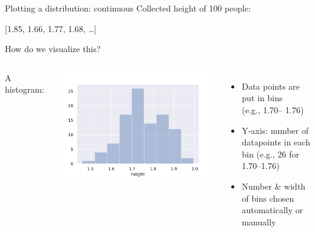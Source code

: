 \documentclass[aspectratio=169,usenames,dvipsnames]{beamer}
\begin{document}
\begin{frame}{Plotting a distribution: continuous}
Collected height of 100 people:

[1.85, 1.66, 1.77, 1.68, \dots]

\vspace{1em}
How do we visualize this?

\pause
\begin{columns}[T]
A histogram:

\includegraphics[height=0.55\textheight]{fig/histogram}
\begin{itemize}
    \item Data points are put in bins \\
        (e.g., 1.70-- 1.76)
        \vspace{1em}

    \item Y-axis: number of datapoints in each bin
        (e.g., 26 for 1.70--1.76)
        \vspace{1em}

    \item Number \& width of bins
        chosen automatically or manually
\end{itemize}
\end{columns}
\end{frame}
\end{document}
